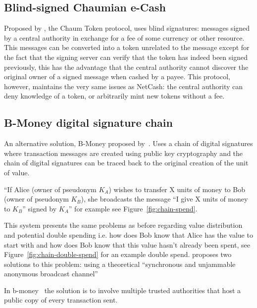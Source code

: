 \subsection{Blind-signed Chaumian e-Cash}
Proposed by \textcite{chaum}, the Chaum Token protocol, uses blind signatures: messages signed by a central authority in exchange for a fee of some currency or other resource. This messages can be converted into a token unrelated to the message except for the fact that the signing server can verify that the token has indeed been signed previously, this has the advantage that the central authority cannot discover the original owner of a signed message when cashed by a payee.  This protocol, however, maintains the very same issues as NetCash: the central authority can deny knowledge of a token, or arbitrarily mint new tokens without a fee.


\subsection{B-Money digital signature chain}\label{digital-sig}
An alternative solution, B-Money proposed by~\textcite{b-money}. Uses a chain of digital signatures where transaction messages are created using public key cryptography and the chain of digital signatures can be traced back to the original creation of the unit of value.

``If Alice (owner of pseudonym $K_A$) wishes to transfer X units of money to Bob (owner of pseudonym $K_B$), she broadcasts the message ``I give X units of money to $K_B$'' signed by $K_A$'' for example see Figure~\ref{fig:chain-spend}.

This system presents the same problems as before regarding value distribution and potential double spending i.e. how does Bob know that Alice has the value to start with and how does Bob know that this value hasn't already been spent, see Figure~\ref{fig:chain-double-spend} for an example double spend. \textcite{b-money} proposes two solutions to this problem: using a theoretical ``synchronous and unjammable anonymous broadcast channel''


In b-money~\cite{b-money} the solution is to involve multiple trusted authorities that host a public copy of every transaction sent.

